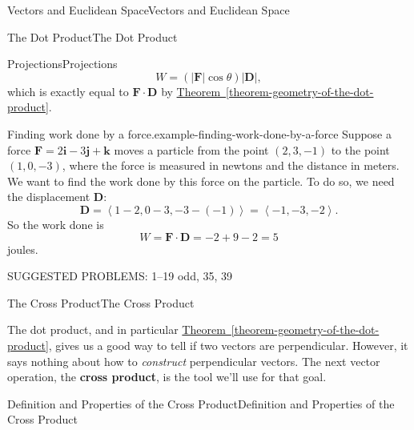 \documentclass[10pt,]{book}
\newcommand{\terminology}[1]{\textbf{#1}}
\numberwithin{equation}{section}
\newcommand{\vv}[1]{\mathbf{#1}}
\newcommand{\dotprod}[1]{\left\langle #1 \right\rangle}
\begin{document}
\begin{chapterptx}{Vectors and Euclidean Space}{}{Vectors and Euclidean Space}{}{}
\begin{sectionptx}{The Dot Product}{}{The Dot Product}{}{}
\begin{subsectionptx}{Projections}{}{Projections}{}{}
%
\begin{equation*}
W = (|\vv{F}|\cos\theta)|\vv{D}|,
\end{equation*}
\hypertarget{p-943}{}%
which is exactly equal to \(\vv{F}\cdot\vv{D}\) by \hyperref[theorem-geometry-of-the-dot-product]{Theorem~\ref{theorem-geometry-of-the-dot-product}}.%
\begin{example}{Finding work done by a force.}{example-finding-work-done-by-a-force}%
\hypertarget{p-944}{}%
Suppose a force \(\vv{F} = 2\vv{i}-3\vv{j}+\vv{k}\) moves a particle from the point \((2,3,-1)\) to the point \((1,0,-3)\), where the force is measured in newtons and the distance in meters. We want to find the work done by this force on the particle. To do so, we need the displacement \(\vv{D}\):%
%
\begin{equation*}
\vv{D} = \dotprod{1-2,0-3,-3-(-1)} = \dotprod{-1,-3,-2}.
\end{equation*}
\hypertarget{p-945}{}%
So the work done is%
%
\begin{equation*}
W = \vv{F}\cdot\vv{D} = -2+9-2 = 5
\end{equation*}
\hypertarget{p-946}{}%
joules.%
\end{example}
\hypertarget{p-947}{}%
SUGGESTED PROBLEMS: 1--19 odd, 35, 39%
\end{subsectionptx}
\end{sectionptx}
%
%
\typeout{************************************************}
\typeout{************************************************}
%
\begin{sectionptx}{The Cross Product}{}{The Cross Product}{}{}\label{section-the-cross-product}
\begin{introduction}{}%
\hypertarget{p-948}{}%
The dot product, and in particular \hyperref[theorem-geometry-of-the-dot-product]{Theorem~\ref{theorem-geometry-of-the-dot-product}}, gives us a good way to tell if two vectors are perpendicular. However, it says nothing about how to \emph{construct} perpendicular vectors. The next vector operation, the \terminology{cross product}, is the tool we'll use for that goal.%
\end{introduction}%
%
%
\typeout{************************************************}
\typeout{************************************************}
%
\begin{subsectionptx}{Definition and Properties of the Cross Product}{}{Definition and Properties of the Cross Product}{}{}\label{subsection-definition-and-properties-of-the-cross-product}

\end{subsectionptx}
\end{sectionptx}
\end{chapterptx}
\end{document}
